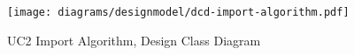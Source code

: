 \begin{figure}[p]%
\end{figure}
\begin{figure}[H]
    \centering
    \texttt{[image: diagrams/designmodel/dcd-import-algorithm.pdf]}
    \caption{UC2 Import Algorithm, Design Class Diagram}
    \label{fig:import-algorithm-dcd}
\end{figure}
\newpage
% 
